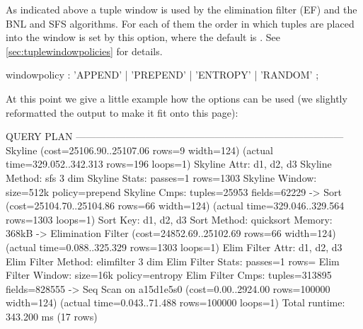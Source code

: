 As indicated above a tuple window is used by the elimination filter
(EF) and the BNL and SFS algorithms. For each of them the order in
which tuples are placed into the window is set by this option, where
the default is . See
\autoref{sec:tuplewindowpolicies} for details.

\begin{rail}
windowpolicy : 'APPEND' | 'PREPEND' | 'ENTROPY' | 'RANDOM' ;
\end{rail}

At this point we give a little example how the options can be
used (we slightly reformatted the output to make it fit onto this page):

\begin{interactive}
 
 
 
 
 
 
 
 
 

                                    QUERY PLAN                                   
---------------------------------------------------------------------------------
 Skyline  (cost=25106.90..25107.06 rows=9 width=124) \prebreak{} 
   \postbreak (actual time=329.052..342.313 rows=196 loops=1) 
   Skyline Attr: d1, d2, d3
   Skyline Method: sfs 3 dim 
   Skyline Stats: passes=1 rows=1303 
   Skyline Window: size=512k policy=prepend 
   Skyline Cmps: tuples=25953 fields=62229 
   ->  Sort  (cost=25104.70..25104.86 rows=66 width=124) \prebreak
         \postbreak (actual time=329.046..329.564 rows=1303 loops=1)
         Sort Key: d1, d2, d3
         Sort Method:  quicksort  Memory: 368kB
         ->  Elimination Filter  (cost=24852.69..25102.69 rows=66 width=124) \prebreak
               \postbreak (actual time=0.088..325.329 rows=1303 loops=1)
               Elim Filter Attr: d1, d2, d3
               Elim Filter Method: elimfilter 3 dim
               Elim Filter Stats: passes=1 rows=
               Elim Filter Window: size=16k policy=entropy 
               Elim Filter Cmps: tuples=313895 fields=828555
               ->  Seq Scan on a15d1e5s0  (cost=0.00..2924.00 rows=100000 \prebreak
                     \postbreak width=124) (actual time=0.043..71.488 rows=100000 loops=1)
 Total runtime: 343.200 ms
(17 rows)
\end{interactive}

